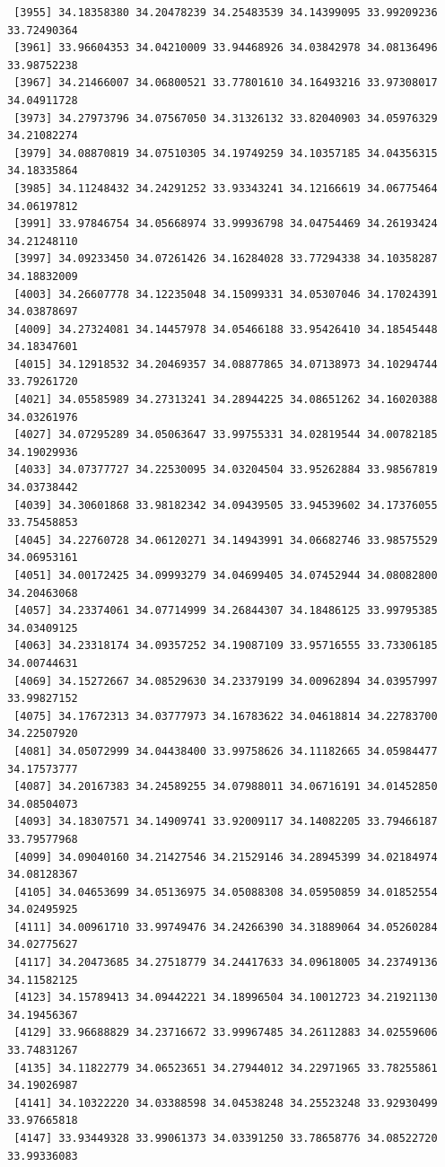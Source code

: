 \documentclass[
  letterpaper,
  DIV=11,
  numbers=noendperiod]{scrartcl}
\begin{document}
\begin{verbatim}
 [3955] 34.18358380 34.20478239 34.25483539 34.14399095 33.99209236 33.72490364
 [3961] 33.96604353 34.04210009 33.94468926 34.03842978 34.08136496 33.98752238
 [3967] 34.21466007 34.06800521 33.77801610 34.16493216 33.97308017 34.04911728
 [3973] 34.27973796 34.07567050 34.31326132 33.82040903 34.05976329 34.21082274
 [3979] 34.08870819 34.07510305 34.19749259 34.10357185 34.04356315 34.18335864
 [3985] 34.11248432 34.24291252 33.93343241 34.12166619 34.06775464 34.06197812
 [3991] 33.97846754 34.05668974 33.99936798 34.04754469 34.26193424 34.21248110
 [3997] 34.09233450 34.07261426 34.16284028 33.77294338 34.10358287 34.18832009
 [4003] 34.26607778 34.12235048 34.15099331 34.05307046 34.17024391 34.03878697
 [4009] 34.27324081 34.14457978 34.05466188 33.95426410 34.18545448 34.18347601
 [4015] 34.12918532 34.20469357 34.08877865 34.07138973 34.10294744 33.79261720
 [4021] 34.05585989 34.27313241 34.28944225 34.08651262 34.16020388 34.03261976
 [4027] 34.07295289 34.05063647 33.99755331 34.02819544 34.00782185 34.19029936
 [4033] 34.07377727 34.22530095 34.03204504 33.95262884 33.98567819 34.03738442
 [4039] 34.30601868 33.98182342 34.09439505 33.94539602 34.17376055 33.75458853
 [4045] 34.22760728 34.06120271 34.14943991 34.06682746 33.98575529 34.06953161
 [4051] 34.00172425 34.09993279 34.04699405 34.07452944 34.08082800 34.20463068
 [4057] 34.23374061 34.07714999 34.26844307 34.18486125 33.99795385 34.03409125
 [4063] 34.23318174 34.09357252 34.19087109 33.95716555 33.73306185 34.00744631
 [4069] 34.15272667 34.08529630 34.23379199 34.00962894 34.03957997 33.99827152
 [4075] 34.17672313 34.03777973 34.16783622 34.04618814 34.22783700 34.22507920
 [4081] 34.05072999 34.04438400 33.99758626 34.11182665 34.05984477 34.17573777
 [4087] 34.20167383 34.24589255 34.07988011 34.06716191 34.01452850 34.08504073
 [4093] 34.18307571 34.14909741 33.92009117 34.14082205 33.79466187 33.79577968
 [4099] 34.09040160 34.21427546 34.21529146 34.28945399 34.02184974 34.08128367
 [4105] 34.04653699 34.05136975 34.05088308 34.05950859 34.01852554 34.02495925
 [4111] 34.00961710 33.99749476 34.24266390 34.31889064 34.05260284 34.02775627
 [4117] 34.20473685 34.27518779 34.24417633 34.09618005 34.23749136 34.11582125
 [4123] 34.15789413 34.09442221 34.18996504 34.10012723 34.21921130 34.19456367
 [4129] 33.96688829 34.23716672 33.99967485 34.26112883 34.02559606 33.74831267
 [4135] 34.11822779 34.06523651 34.27944012 34.22971965 33.78255861 34.19026987
 [4141] 34.10322220 34.03388598 34.04538248 34.25523248 33.92930499 33.97665818
 [4147] 33.93449328 33.99061373 34.03391250 33.78658776 34.08522720 33.99336083

\end{verbatim}
\end{document}
